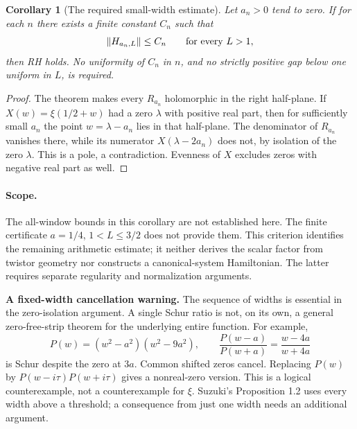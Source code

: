 \documentclass[11pt,letterpaper]{article}
\newtheorem{corollary}[theorem]{Corollary}
\begin{document}
\begin{corollary}[The required small-width estimate]
Let $a_n>0$ tend to zero.  If for each $n$ there exists a finite constant
$C_n$ such that
\[
 \|H_{a_n,L}\|\leq C_n\qquad\hbox{for every }L>1,
\]
then RH holds.  No uniformity of $C_n$ in $n$, and no strictly positive
gap below one uniform in $L$, is required.
\end{corollary}

\begin{proof}
The theorem makes every $R_{a_n}$ holomorphic in the right half-plane.
If $X(w)=\xi(1/2+w)$ had a zero $\lambda$ with positive real part,
then for sufficiently small $a_n$ the point $w=\lambda-a_n$ lies in that
half-plane.  The denominator of $R_{a_n}$ vanishes there, while its
numerator $X(\lambda-2a_n)$ does not, by isolation of the zero $\lambda$.
This is a pole, a contradiction.  Evenness of $X$ excludes zeros with
negative real part as well.
\end{proof}

\paragraph{Scope.}
The all-window bounds in this corollary are not established here.
The finite certificate $a=1/4$, $1<L\leq3/2$ does not provide them.
This criterion identifies the remaining arithmetic estimate; it neither
derives the scalar factor from twistor geometry nor constructs a
canonical-system Hamiltonian.  The latter requires separate regularity
and normalization arguments.


\textbf{A fixed-width cancellation warning.} The sequence of widths is essential in the zero-isolation argument. A single Schur ratio is not, on its own, a general zero-free-strip theorem for the underlying entire function. For example,
\[
 P(w)=(w^2-a^2)(w^2-9a^2),\qquad
 \frac{P(w-a)}{P(w+a)}=\frac{w-4a}{w+4a}
\]
is Schur despite the zero at $3a$. Common shifted zeros cancel. Replacing $P(w)$ by $P(w-i\tau)P(w+i\tau)$ gives a nonreal-zero version. This is a logical counterexample, not a counterexample for $\xi$. Suzuki's Proposition 1.2 uses every width above a threshold; a consequence from just one width needs an additional argument.
\end{document}
